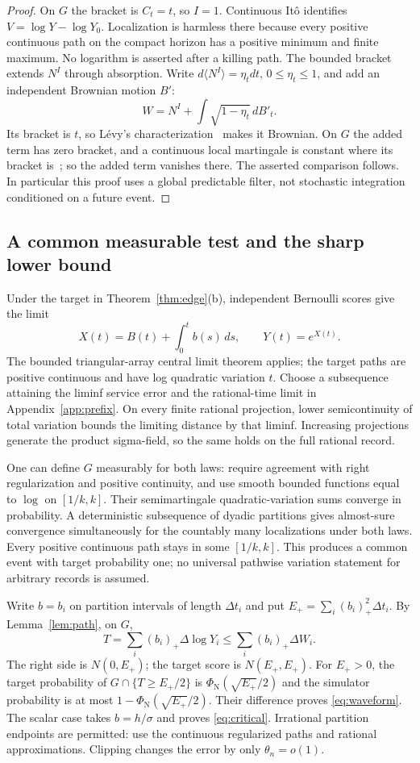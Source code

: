 \documentclass[11pt]{article}
\theoremstyle{definition}
\theoremstyle{remark}
\newcommand{\Ncdf}{\Phi_{\mathrm N}}
\begin{document}
\begin{proof}
On $G$ the bracket is $C_t=t$, so $I=1$. Continuous It\^o identifies $V=\log Y-\log Y_0$. Localization is harmless there because every positive continuous path on the compact horizon has a positive minimum and finite maximum. No logarithm is asserted after a killing path. The bounded bracket extends $N^I$ through absorption. Write $d\langle N^I\rangle=\eta_tdt$, $0\le\eta_t\le1$, and add an independent Brownian motion $B'$:
\[
 W=N^I+\int\sqrt{1-\eta_t}\,dB'_t.
\]
Its bracket is $t$, so L\'evy's characterization~\cite[Theorem~IV.3.6]{RevuzYor} makes it Brownian. On $G$ the added term has zero bracket, and a continuous local martingale is constant where its bracket is~\cite[Proposition~IV.1.13]{RevuzYor}; so the added term vanishes there. The asserted comparison follows. In particular this proof uses a global predictable filter, not stochastic integration conditioned on a future event.
\end{proof}

\subsection{A common measurable test and the sharp lower bound}\label{sec:test}

Under the target in Theorem~\ref{thm:edge}(b), independent Bernoulli scores give the limit
\[
 X(t)=B(t)+\int_0^t b(s)\,ds,\qquad Y(t)=e^{X(t)}.
\]
The bounded triangular-array central limit theorem applies; the target paths are positive continuous and have log quadratic variation $t$. Choose a subsequence attaining the liminf service error and the rational-time limit in Appendix~\ref{app:prefix}. On every finite rational projection, lower semicontinuity of total variation bounds the limiting distance by that liminf. Increasing projections generate the product sigma-field, so the same holds on the full rational record.

One can define $G$ measurably for both laws: require agreement with right regularization and positive continuity, and use smooth bounded functions equal to $\log$ on $[1/k,k]$. Their semimartingale quadratic-variation sums converge in probability. A deterministic subsequence of dyadic partitions gives almost-sure convergence simultaneously for the countably many localizations under both laws. Every positive continuous path stays in some $[1/k,k]$. This produces a common event with target probability one; no universal pathwise variation statement for arbitrary records is assumed.

Write $b=b_i$ on partition intervals of length $\Delta t_i$ and put $E_+=\sum_i(b_i)_+^2\Delta t_i$. By Lemma~\ref{lem:path}, on $G$,
\[
 T=\sum_i(b_i)_+\Delta\log Y_i
 \le\sum_i(b_i)_+\Delta W_i.
\]
The right side is $N(0,E_+)$; the target score is $N(E_+,E_+)$. For $E_+>0$, the target probability of $G\cap\{T\ge E_+/2\}$ is $\Ncdf(\sqrt{E_+}/2)$ and the simulator probability is at most $1-\Ncdf(\sqrt{E_+}/2)$. Their difference proves \eqref{eq:waveform}. The scalar case takes $b=h/\sigma$ and proves \eqref{eq:critical}. Irrational partition endpoints are permitted: use the continuous regularized paths and rational approximations. Clipping changes the error by only $\theta_n=o(1)$.
\end{document}
